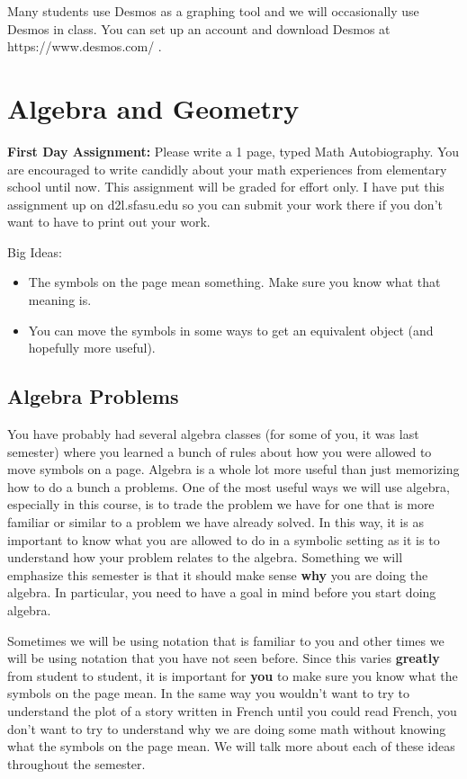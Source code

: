 Many students use Desmos as a graphing tool and we will occasionally use Desmos in class. You can set up an account and download Desmos at https://www.desmos.com/ .


\mainmatter




\chapter{Algebra and Geometry}
\textbf{First Day Assignment:} Please write a 1 page, typed Math Autobiography. You are encouraged to write candidly about your math experiences from elementary school until now. This assignment will be graded for effort only. I have put this  assignment up on  d2l.sfasu.edu so you can submit your work there if you don't want to have to print out your work.

Big Ideas:
\begin{itemize}
\item The symbols on the page mean something. Make sure you know what that meaning is.
\item You can move the symbols in some ways to get an equivalent object (and hopefully more useful).
\end{itemize}

\section{Algebra Problems}
You have probably had several algebra classes (for some of you, it was last semester) where you learned a bunch of rules about how you were allowed to move symbols on a page. Algebra is a whole lot more useful than just memorizing how to do a bunch a problems. One of the most useful ways we will use algebra, especially in this course, is to trade the problem we have for one that is more familiar or similar to a problem we have already solved. In this way, it is as important to know what you are allowed to do in a symbolic setting as it is to understand how your problem relates to the algebra. Something we will emphasize this semester is that it should make sense \textbf{why} you are doing the algebra. In particular, you need to have a goal in mind before you start doing algebra.

Sometimes we will be using notation that is familiar to you and other times we will be using notation that you have not seen before. Since this varies \textbf{greatly} from student to student, it is important for \textbf{you} to make sure you know what the symbols on the page mean. In the same way you wouldn't want to try to understand the plot of a story written in French until you could read French, you don't want to try to understand why we are doing some math without knowing what the symbols on the page mean. We will talk more about each of these ideas throughout the semester.


